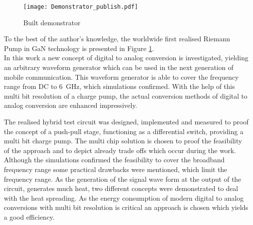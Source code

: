 \begin{figure}[h]
	\centering
  \texttt{[image: Demonstrator\_publish.pdf]}
	\caption{Built demonstrator}
	\label{fig:Demonstrator}
\end{figure}
To the best of the author's knowledge, the worldwide first realised Riemann Pump in GaN technology is presented in Figure \ref{fig:Demonstrator}.\\

In this work a new concept of digital to analog conversion is investigated, yielding an arbitrary waveform generator which can be used in the next generation of mobile communication.
This waveform generator is able to cover the frequency range from DC to \SI{6}{\giga \hertz}, which simulations confirmed.
With the help of this multi bit resolution of a charge pump, the actual conversion methods of digital to analog conversion are enhanced impressively.


The realised hybrid test circuit was designed, implemented and measured to proof the concept of a push-pull stage, functioning as a differential switch, providing a multi bit charge pump.
The multi chip solution is chosen to proof the feasibility of the approach and to depict already trade offs which occur during the work.\\
Although the simulations confirmed the feasibility to cover the broadband frequency range some practical drawbacks were mentioned, which limit the frequency range.
As the generation of the signal wave form at the output of the circuit, generates much heat, two different concepts were demonstrated to deal with the heat spreading.
As the energy consumption of modern digital to analog conversions with multi bit resolution is critical an approach is chosen which yields a good efficiency.



